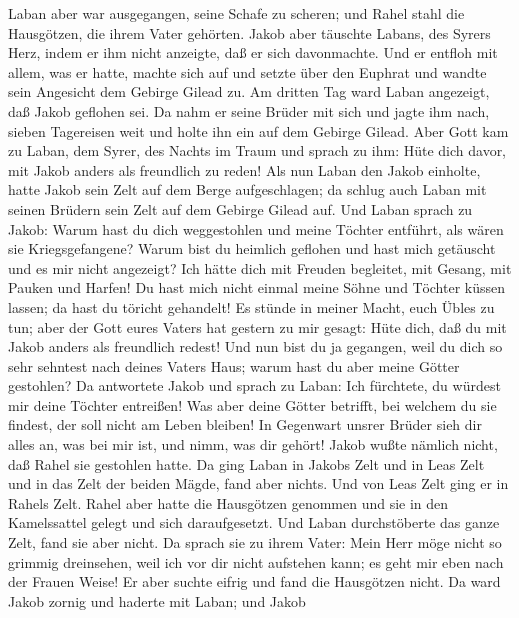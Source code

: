  Laban aber war ausgegangen, seine Schafe zu scheren; und
Rahel stahl die Hausgötzen, die ihrem Vater gehörten. 
Jakob aber täuschte Labans, des Syrers Herz, indem er ihm nicht
anzeigte, daß er sich davonmachte.  Und er entfloh mit
allem, was er hatte, machte sich auf und setzte über den Euphrat und
wandte sein Angesicht dem Gebirge Gilead zu.  Am dritten
Tag ward Laban angezeigt, daß Jakob geflohen sei.  Da
nahm er seine Brüder mit sich und jagte ihm nach, sieben Tagereisen weit
und holte ihn ein auf dem Gebirge Gilead.  Aber Gott kam
zu Laban, dem Syrer, des Nachts im Traum und sprach zu ihm: Hüte dich
davor, mit Jakob anders als freundlich zu reden!  Als nun
Laban den Jakob einholte, hatte Jakob sein Zelt auf dem Berge
aufgeschlagen; da schlug auch Laban mit seinen Brüdern sein Zelt auf dem
Gebirge Gilead auf.  Und Laban sprach zu Jakob: Warum
hast du dich weggestohlen und meine Töchter entführt, als wären sie
Kriegsgefangene?  Warum bist du heimlich geflohen und
hast mich getäuscht und es mir nicht angezeigt? Ich hätte dich mit
Freuden begleitet, mit Gesang, mit Pauken und Harfen!  Du
hast mich nicht einmal meine Söhne und Töchter küssen lassen; da hast du
töricht gehandelt!  Es stünde in meiner Macht, euch Übles
zu tun; aber der Gott eures Vaters hat gestern zu mir gesagt: Hüte dich,
daß du mit Jakob anders als freundlich redest!  Und nun
bist du ja gegangen, weil du dich so sehr sehntest nach deines Vaters
Haus; warum hast du aber meine Götter gestohlen?  Da
antwortete Jakob und sprach zu Laban: Ich fürchtete, du würdest mir
deine Töchter entreißen!  Was aber deine Götter betrifft,
bei welchem du sie findest, der soll nicht am Leben bleiben! In
Gegenwart unsrer Brüder sieh dir alles an, was bei mir ist, und nimm,
was dir gehört! Jakob wußte nämlich nicht, daß Rahel sie gestohlen
hatte.  Da ging Laban in Jakobs Zelt und in Leas Zelt und
in das Zelt der beiden Mägde, fand aber nichts. Und von Leas Zelt ging
er in Rahels Zelt.  Rahel aber hatte die Hausgötzen
genommen und sie in den Kamelssattel gelegt und sich daraufgesetzt. Und
Laban durchstöberte das ganze Zelt, fand sie aber nicht. 
Da sprach sie zu ihrem Vater: Mein Herr möge nicht so grimmig
dreinsehen, weil ich vor dir nicht aufstehen kann; es geht mir eben nach
der Frauen Weise! Er aber suchte eifrig und fand die Hausgötzen nicht.
 Da ward Jakob zornig und haderte mit Laban; und Jakob
